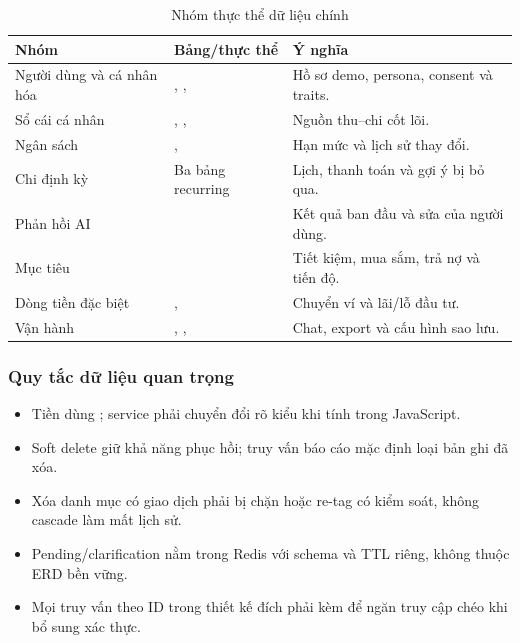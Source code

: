 \begin{table}[H]
  \centering
  \caption{Nhóm thực thể dữ liệu chính}
  \label{tab:data-entities}
  \begin{tabularx}{\textwidth}{@{}L{3.8cm}Y Y@{}}
    \toprule
    \textbf{Nhóm} & \textbf{Bảng/thực thể} & \textbf{Ý nghĩa} \\
    \midrule
    Người dùng và cá nhân hóa & , ,  & Hồ sơ demo, persona, consent và traits. \\
    Sổ cái cá nhân & , ,  & Nguồn thu--chi cốt lõi. \\
    Ngân sách & ,  & Hạn mức và lịch sử thay đổi. \\
    Chi định kỳ & Ba bảng recurring & Lịch, thanh toán và gợi ý bị bỏ qua. \\
    Phản hồi AI &  & Kết quả ban đầu và sửa của người dùng. \\
    Mục tiêu &  & Tiết kiệm, mua sắm, trả nợ và tiến độ. \\
    Dòng tiền đặc biệt & ,  & Chuyển ví và lãi/lỗ đầu tư. \\
    Vận hành & , ,  & Chat, export và cấu hình sao lưu. \\
    \bottomrule
  \end{tabularx}
\end{table}

\subsubsection{Quy tắc dữ liệu quan trọng}

\begin{itemize}
  \item Tiền dùng ; service phải chuyển đổi rõ kiểu khi tính trong JavaScript.
  \item Soft delete giữ khả năng phục hồi; truy vấn báo cáo mặc định loại bản ghi đã xóa.
  \item Xóa danh mục có giao dịch phải bị chặn hoặc re-tag có kiểm soát, không cascade làm mất lịch sử.
  \item Pending/clarification nằm trong Redis với schema và TTL riêng, không thuộc ERD bền vững.
  \item Mọi truy vấn theo ID trong thiết kế đích phải kèm  để ngăn truy cập chéo khi bổ sung xác thực.
\end{itemize}

